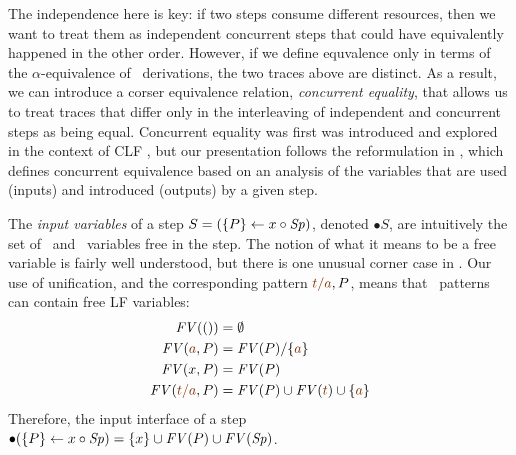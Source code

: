 The independence here is key: if two steps consume different
resources, then we want to treat them as independent concurrent steps
that could have equivalently happened in the other order. However, if
we define equvalence only in terms of the $\alpha$-equivalence of
\ollll~derivations, the two traces above are distinct. As a result, we
can introduce a corser equivalence relation, {\it concurrent
  equality}, that allows us to treat traces that differ only in the
interleaving of independent and concurrent steps as being equal.
Concurrent equality was first was introduced and explored in the
context of CLF \cite{watkins02concurrent}, but our presentation
follows the reformulation in \cite{cervesato12trace}, which defines
concurrent equivalence based on an analysis of the variables that 
are used (inputs) and introduced (outputs) by a given step.

The {\it input variables} of a step $S = (\{{P}\} \leftarrow {x} \circ {{\it Sp}})$, denoted
${\bullet}S$, are intuitively the set of \lf~and \sls~variables free in
the step. The notion of what it means to be a free variable is fairly
well understood, but there is one unusual corner case in \sls. Our use
of unification, and the corresponding pattern $\lf{t/a}, P$, means
that \sls~patterns can contain free LF variables:
\begin{align*}
{\it FV}(()) & = \emptyset
\\
{\it FV}(\lf{a}, P) & = {\it FV}(P)/\{\lf{a}\} 
\\
{\it FV}(x, P) & = {\it FV}(P)
\\
{\it FV}(\lf{t/a}, P) & =  {\it FV}(P) \cup {\it FV}(\lf{t}) \cup \{ \lf{a} \}
\end{align*}
Therefore, the input interface of a step ${\bullet}(\{{P}\} \leftarrow {x} \circ {{\it Sp}})
= \{ x \} \cup {\it FV}(P) \cup {\it FV}({\it Sp})$.


